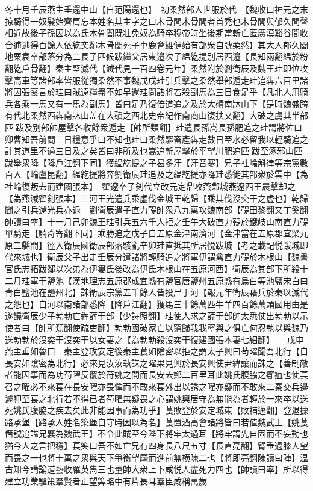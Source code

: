冬十月壬辰燕主垂還中山【自范陽還也】　初柔然部人世服於代　【魏收曰神元之末掠騎得一奴髪始齊肩忘本姓名其主字之曰木骨閭木骨閭者首禿也木骨閭與郁久閭聲相近故後子孫因以為氏木骨閭既壮免奴為騎卒穆帝時坐後期當斬亡匿廣漠谿谷間收合逋逃得百餘人依紇突鄰木骨閭死子車鹿會雄健始有部衆自號柔然】其大人郁久閭地粟袁卒部落分為二長子匹候跋繼父居東邉次子緼紇提别居西邉【長知兩翻緼於粉翻紇戶骨翻】秦主堅滅代【滅代見一百四卷元年】柔然附於劉衛辰及魏王珪即位攻擊高車等諸部率皆服從獨柔然不事魏戊戌珪引兵擊之柔然舉部遁走珪追犇六百里諸將因張衮言於珪曰賊遠糧盡不如早還珪問諸將若殺副馬為三日食足乎【凡北人用騎兵各乘一馬又有一馬為副馬】皆曰足乃復倍道追之及於大磧南牀山下【是時魏盛跨有代北柔然西犇南牀山盖在大磧之西北史帝紀作南商山復扶又翻】大破之虜其半部匹跋及别部帥屋擊各收餘衆遁走【帥所類翻】珪遣長孫嵩長孫肥追之珪謂將佐曰卿曹知吾前問三日糧意乎曰不知也珪曰柔然驅畜產犇走數日至水必留我以輕騎追之計其道里不過三日及之矣皆曰非所及也嵩追斬屋擊於平望川肥追匹跋至涿邪山匹跋舉衆降【降戶江翻下同】獲緼紇提之子曷多汗【汗音寒】兄子社崘斛律等宗黨數百人【崘盧昆翻】緼紇提將奔劉衛辰珪追及之緼紇提亦降珪悉徙其部衆於雲中【為社崘復叛去而建國張本】　翟遼卒子釗代立改元定鼎攻燕鄴城燕遼西王農擊却之【為燕滅翟釗張本】三河王光遣兵乘虚伐金城王乾歸【乘其伐沒奕干之虚也】乾歸聞之引兵還光兵亦退　劉衛辰遣子直力鞮帥衆八九萬攻魏南部【鞮田黎翻又丁奚翻帥讀曰率】十一月己卯魏王珪引兵五六千人拒之壬午大破直力鞮於鐵岐山南直力鞮單騎走【騎奇寄翻下同】乘勝追之戊子自五原金津南濟河【金津當在五原郡宜梁九原二縣間】徑入衛辰國衛辰部落駭亂辛卯珪直抵其所居悦跋城【考之載記悦跋城即代來城也】衛辰父子出走壬辰分遣諸將輕騎追之將軍伊謂禽直力鞮於木根山【魏書官氏志拓跋鄰以次弟為伊婁氏後改為伊氏木根山在五原河西】衛辰為其部下所殺十二月珪軍于鹽池【漢地理志五原郡成宜縣有鹽官唐鹽州五原縣有烏白等池鹽宋白曰青白鹽池在鹽州北】誅衛辰宗黨五千餘人皆投尸于河【報元年衛辰藉兵於秦以滅代之怨也】自河以南諸部悉降【降戶江翻】獲馬三十餘萬匹牛羊四百餘萬頭國用由是遂饒衛辰少子勃勃亡犇薛于部【少詩照翻】珪使人求之薛于部帥太悉仗出勃勃以示使者曰【帥所類翻使疏吏翻】勃勃國破家亡以窮歸我我寧與之俱亡何忍執以與魏乃送勃勃於沒奕干沒奕干以女妻之【為勃勃殺沒奕干復建國張本妻七細翻】　　戊申燕主垂如魯口　秦主登攻安定後秦主萇如隂密以拒之謂太子興曰苟曜聞吾北行【自長安如隂密為北行】必來見汝汝執誅之曜果見興於長安興使尹緯讓而誅之【善制敵者能因事而為功苟曜反覆於苻姚之間而長安去鄭二百里耳此姚氏腹脇之癰疽也使萇召之曜必不來萇在長安曜亦畏憚而不敢來萇外出以誘之曜亦疑而不敢來二秦交兵邉遽狎至萇之北行若不得已者苟曜無疑畏之心謂姚興居守為無能為者輕於一來卒以送死姚氏腹脇之疾去矣此非能因事而為功乎】萇敗登於安定城東【敗補邁翻】登退據路承堡【路承人姓名築堡自守時因以為名】萇置酒高會諸將皆曰若值魏武王【姚萇僭號追諡兄襄為魏武王】不令此賊至今陛下將牢太過耳【將牢謂先自固而不妄動也猶今人之言把穩】萇笑曰吾不如亡兄有四身長八尺五寸【長直亮翻】臂垂過膝人望而畏之一也將十萬之衆與天下爭衡望麾而進前無横陳二也【將即亮翻陳讀曰陣】温古知今講論道藝收羅英雋三也董帥大衆上下咸悦人盡死力四也【帥讀曰率】所以得建立功業驅策羣賢者正望筭略中有片長耳羣臣咸稱萬歲

